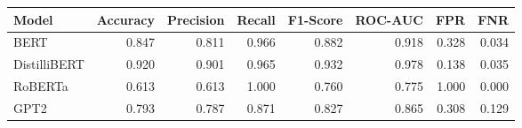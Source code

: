 \begin{tabular}{|l||r|r|r|r|r|r|r|}
\toprule
Model & \textbf{Accuracy} & \textbf{Precision} & Recall & \textbf{F1-Score} & \textbf{ROC-AUC} & \textbf{FPR} & FNR \\
\midrule \midrule
BERT & 0.847 & 0.811 & 0.966 & 0.882 & 0.918 & 0.328 & 0.034 \\
DistilliBERT & 0.920 & 0.901 & 0.965 & 0.932 & 0.978 & 0.138 & 0.035 \\
RoBERTa & 0.613 & 0.613 & 1.000 & 0.760 & 0.775 & 1.000 & 0.000 \\
GPT2 & 0.793 & 0.787 & 0.871 & 0.827 & 0.865 & 0.308 & 0.129 \\
\bottomrule
\end{tabular}
